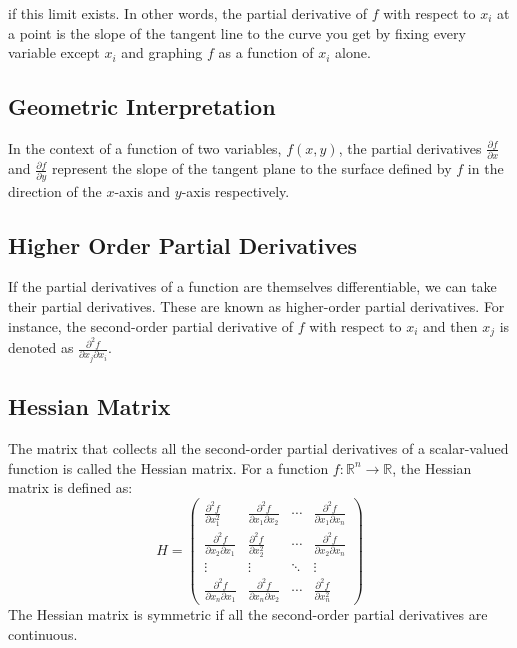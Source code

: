 if this limit exists. In other words, the partial derivative of \( f \) with respect to \( x_i \) at a point is the slope of the tangent line to the curve you get by fixing every variable except \( x_i \) and graphing \( f \) as a function of \( x_i \) alone.

\subsection{Geometric Interpretation}
In the context of a function of two variables, \( f(x, y) \), the partial derivatives \( \frac{\partial f}{\partial x} \) and \( \frac{\partial f}{\partial y} \) represent the slope of the tangent plane to the surface defined by \( f \) in the direction of the \( x \)-axis and \( y \)-axis respectively.

\subsection{Higher Order Partial Derivatives}
If the partial derivatives of a function are themselves differentiable, we can take their partial derivatives. These are known as higher-order partial derivatives. For instance, the second-order partial derivative of \( f \) with respect to \( x_i \) and then \( x_j \) is denoted as \( \frac{\partial^2 f}{\partial x_j \partial x_i} \).

\subsection{Hessian Matrix}
The matrix that collects all the second-order partial derivatives of a scalar-valued function is called the Hessian matrix. For a function \( f: \mathbb{R}^n \rightarrow \mathbb{R} \), the Hessian matrix is defined as:
$$ H = \begin{pmatrix}
\frac{\partial^2 f}{\partial x_1^2} & \frac{\partial^2 f}{\partial x_1 \partial x_2} & \cdots & \frac{\partial^2 f}{\partial x_1 \partial x_n} \\
\frac{\partial^2 f}{\partial x_2 \partial x_1} & \frac{\partial^2 f}{\partial x_2^2} & \cdots & \frac{\partial^2 f}{\partial x_2 \partial x_n} \\
\vdots & \vdots & \ddots & \vdots \\
\frac{\partial^2 f}{\partial x_n \partial x_1} & \frac{\partial^2 f}{\partial x_n \partial x_2} & \cdots & \frac{\partial^2 f}{\partial x_n^2}
\end{pmatrix} $$
The Hessian matrix is symmetric if all the second-order partial derivatives are continuous.

